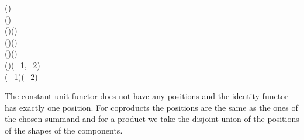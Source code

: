 \begin{hscode}\SaveRestoreHook
{}%
%
%
%
%
%
\>[3]{}\mathbin{::}(\mathbin{::})\to {}\;\to \mathbin{*}{}\<[E]%
\\
\>[3]{}\;\;{}\<[18]%
\>[18]{}(){}\<[29]%
\>[29]{}\mathrel{=}\<[E]%
\\
\>[3]{}\;\;{}\<[18]%
\>[18]{}(){}\<[29]%
\>[29]{}\mathrel{=}(){}\<[E]%
\\
\>[3]{}\;(\;\;)\;{}\<[18]%
\>[18]{}(\;){}\<[29]%
\>[29]{}\mathrel{=}\;\;\<[E]%
\\
\>[3]{}\;(\;\;)\;{}\<[18]%
\>[18]{}(\;){}\<[29]%
\>[29]{}\mathrel{=}\;\;\<[E]%
\\
\>[3]{}\;(\;\;)\;{}\<[18]%
\>[18]{}(_1,_2){}\<[29]%
\>[29]{}\mathrel{=}{}\<[E]%
\\
\>[3]{}\<[5]%
\>[5]{}\;(\;\;_1)\;(\;\;_2){}\<[E]%
\ColumnHook
\end{hscode}\resethooks
The constant unit functor does not have any positions and the identity
functor has exactly one position. For coproducts the positions are the
same as the ones of the chosen summand and for a product we take the
disjoint union of the positions of the shapes of the components.

